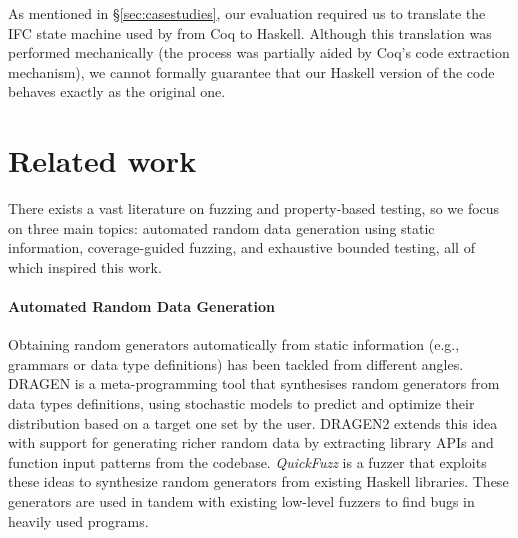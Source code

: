 \documentclass[sigconf,review,anonymous]{acmart}
\begin{document}
As mentioned in \S \ref{sec:casestudies}, our evaluation required us to
translate the IFC state machine used by \citeauthor{lampropoulos2019coverage}
from Coq to Haskell. 
%
Although this translation was performed mechanically (the process was partially
aided by Coq's code extraction mechanism), we cannot formally guarantee that our
Haskell version of the code behaves exactly as the original one. 
%


%



\section{Related work}
\label{sec:related}

There exists a vast literature on fuzzing and property-based testing, so we
focus on three main topics:
%
automated random data generation using static information,
%
coverage-guided fuzzing, and
%
exhaustive bounded testing, all of which inspired this work.


\paragraph{Automated Random Data Generation}

Obtaining random generators automatically from static information (e.g.,
grammars or data type definitions) has been tackled from different angles.
%
DRAGEN \cite{DBLP:conf/haskell/MistaRH18} is a meta-programming tool that
synthesises random generators from data types definitions, using stochastic
models to predict and optimize their distribution based on a target one set by
the user.
%
DRAGEN2 \cite{Mista2019GeneratingRS} extends this idea with support for
generating richer random data by extracting library APIs and function input
patterns from the codebase.
%
%
%
%
\emph{QuickFuzz} \cite{GriecoCB16, grieco2017} is a fuzzer that exploits these
ideas to synthesize random generators from existing Haskell libraries. These
generators are used in tandem with existing low-level fuzzers to find bugs in
heavily used programs.
\end{document}
